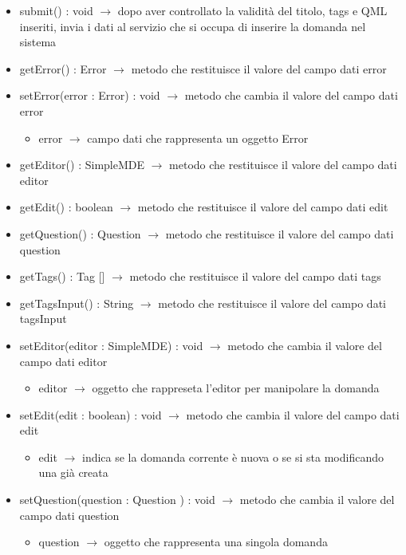 \begin{description}
\begin{itemize}
	\item submit() : void $\rightarrow$ dopo aver controllato la validità del titolo, tags e QML inseriti, invia i dati al servizio che si occupa di inserire la domanda nel sistema
	\item getError() : Error $\rightarrow$ metodo che restituisce il valore del campo dati error
	\item setError(error : Error) : void $\rightarrow$ metodo che cambia il valore del campo dati error\begin{itemize}
		\item error $\rightarrow$ campo dati che rappresenta un oggetto Error
	\end{itemize}
	
	\item getEditor() : SimpleMDE $\rightarrow$ metodo che restituisce il valore del campo dati editor
	\item getEdit() : boolean $\rightarrow$ metodo che restituisce il valore del campo dati edit
	\item getQuestion() : Question  $\rightarrow$ metodo che restituisce il valore del campo dati question
	\item getTags() : Tag [] $\rightarrow$ metodo che restituisce il valore del campo dati tags
	\item getTagsInput() : String $\rightarrow$ metodo che restituisce il valore del campo dati tagsInput
	\item setEditor(editor : SimpleMDE) : void $\rightarrow$ metodo che cambia il valore del campo dati editor\begin{itemize}
		\item editor $\rightarrow$ oggetto che rappreseta l'editor per manipolare la domanda
	\end{itemize}
	
	\item setEdit(edit : boolean) : void $\rightarrow$ metodo che cambia il valore del campo dati edit\begin{itemize}
		\item edit $\rightarrow$ indica se la domanda corrente è nuova o se si sta modificando una già creata
	\end{itemize}
	
	\item setQuestion(question : Question ) : void $\rightarrow$ metodo che cambia il valore del campo dati question\begin{itemize}
		\item question $\rightarrow$ oggetto che rappresenta una singola domanda
	\end{itemize}
	

\end{itemize}
\end{description}
